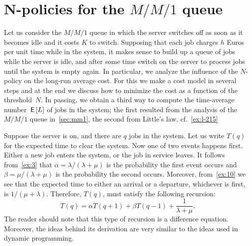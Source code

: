 
\section{N-policies for the $M/M/1$ queue}
\label{sec:n-policies}


Let us consider the $M/M/1$ queue in which the server switches off as soon as it becomes idle and it costs $K$ to switch.
Supposing that each job charges $h$ Euros per unit time while in the system, it makes sense to build up a queue of jobs while the server is idle, and after some time switch on the server to process jobs until the system is empty again.
In particular, we analyze the influence of the $N$-policy on the long-run average cost.
For this we make a cost model in several steps and at the end we discuss how to minimize the cost as a function of the threshold~$N$.
In passing, we obtain a third way to compute the time-average number $\,\mathsf{E}\left[L\right]$ of jobs in the system; the first resulted from the analysis of the $M/M/1$ queue in~\cref{sec:mm1}, the second from Little's law, cf.~\cref{ex:l-215}




Suppose the server is on, and there are $q$ jobs in the system.
Let us write $T(q)$ for the expected time to clear the system.
Now one of two events happens first.
Either a new job enters the system, or the job in service leaves.
It follows from~\cref{ex:3} that $\alpha=\lambda/(\lambda+\mu)$ is the probability the first event occurs and $\beta=\mu/(\lambda+\mu)$ is the probability the second occurs.
Moreover, from~\cref{ex:10} we see that the expected time to either an arrival or a departure, whichever is first, is $1/(\mu+\lambda)$.
Therefore, $T(q)$, must satisfy the following recursion:
\begin{equation}
  \label{eq:92}
  T(q) = \alpha T(q+1) + \beta T(q-1) + \frac{1}{\lambda+\mu}. 
\end{equation}
The reader should note that this type of recursion is a difference equation.
Moreover, the ideas behind its derivation are very similar to the ideas used in dynamic programming.

